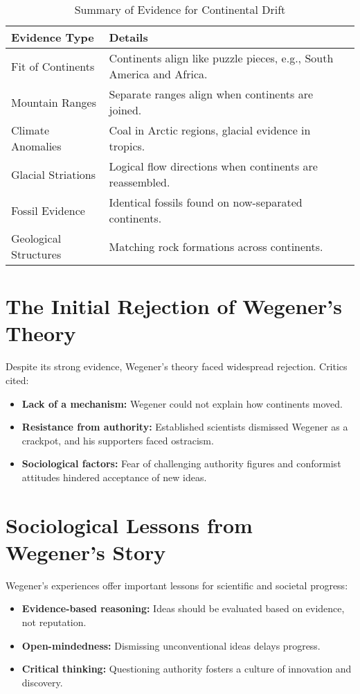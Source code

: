 \documentclass{article}
\begin{document}
\begin{table}[h!]
    \centering
    \caption{Summary of Evidence for Continental Drift}
    \begin{tabular}{@{}ll@{}}
        \toprule
        \textbf{Evidence Type}       & \textbf{Details} \\ 
        \midrule
        Fit of Continents            & Continents align like puzzle pieces, e.g., South America and Africa. \\ 
        Mountain Ranges              & Separate ranges align when continents are joined. \\ 
        Climate Anomalies            & Coal in Arctic regions, glacial evidence in tropics. \\ 
        Glacial Striations           & Logical flow directions when continents are reassembled. \\ 
        Fossil Evidence              & Identical fossils found on now-separated continents. \\ 
        Geological Structures        & Matching rock formations across continents. \\ 
        \bottomrule
    \end{tabular}
\end{table}

\section{The Initial Rejection of Wegener's Theory}

Despite its strong evidence, Wegener's theory faced widespread rejection. Critics cited:
\begin{itemize}
    \item \textbf{Lack of a mechanism:} Wegener could not explain how continents moved.
    \item \textbf{Resistance from authority:} Established scientists dismissed Wegener as a crackpot, and his supporters faced ostracism.
    \item \textbf{Sociological factors:} Fear of challenging authority figures and conformist attitudes hindered acceptance of new ideas.
\end{itemize}

\section{Sociological Lessons from Wegener's Story}

Wegener's experiences offer important lessons for scientific and societal progress:
\begin{itemize}
    \item \textbf{Evidence-based reasoning:} Ideas should be evaluated based on evidence, not reputation.
    \item \textbf{Open-mindedness:} Dismissing unconventional ideas delays progress.
    \item \textbf{Critical thinking:} Questioning authority fosters a culture of innovation and discovery.
\end{itemize}
\end{document}
